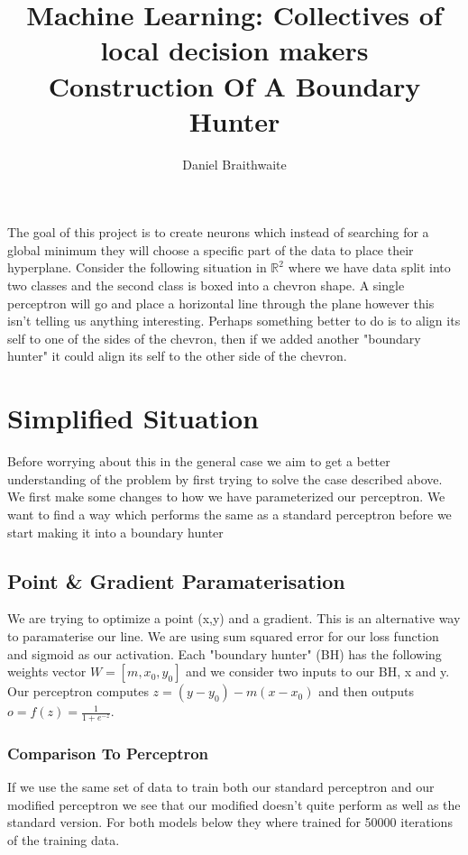 \documentclass{article}
\title{%
	Machine Learning: Collectives of local decision makers\\
	\large Construction Of A Boundary Hunter
}
\author{Daniel Braithwaite}
\theoremstyle{definition}
\begin{document}
\maketitle

The goal of this project is to create neurons which instead of searching for a global minimum they will choose a specific part of the data to place their hyperplane. Consider the following situation in $\mathbb{R}^2$ where we have data split into two classes and the second class is boxed into a chevron shape. A single perceptron will go and place a horizontal line through the plane however this isn't telling us anything interesting. Perhaps something better to do is to align its self to one of the sides of the chevron, then if we added another "boundary hunter" it could align its self to the other side of the chevron.

\section{Simplified Situation}
Before worrying about this in the general case we aim to get a better understanding of the problem by first trying to solve the case described above. We first make some changes to how we have parameterized our perceptron. We want to find a way which performs the same as a standard perceptron before we start making it into a boundary hunter

\subsection{Point \& Gradient Paramaterisation}
We are trying to optimize a point (x,y) and a gradient. This is an alternative way to paramaterise our line. We are using sum squared error for our loss function and sigmoid as our activation. Each "boundary hunter" (BH) has the following weights vector $W = [m, x_0, y_0]$ and we consider two inputs to our BH, x and y. Our perceptron computes $z = (y - y_0) - m(x - x_0)$ and then outputs $o = f(z) = \frac{1}{1+e^{-z}}$.

\subsubsection{Comparison To Perceptron}
If we use the same set of data to train both our standard perceptron and our modified perceptron we see that our modified doesn't quite perform as well as the standard version. For both models below they where trained for 50000 iterations of the training data.
\end{document}
